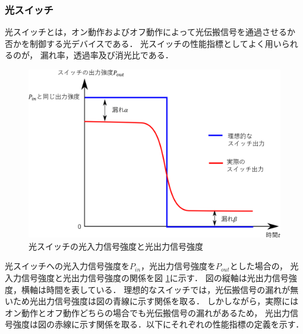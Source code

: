 \subsubsection{光スイッチ}
光スイッチとは，オン動作およびオフ動作によって光伝搬信号を通過させるか
否かを制御する光デバイスである．
光スイッチの性能指標としてよく用いられるのが，
漏れ率，透過率及び消光比である．
\begin{figure}[t!]
\begin{center}
\includegraphics[keepaspectratio,scale=0.5]{fig/3/swichout.eps}
\caption{光スイッチの光入力信号強度と光出力信号強度}
\label{fig:swichout}
\end{center}
\end{figure}
光スイッチへの光入力信号強度を$P_{in}$，光出力信号強度を$P_{out}$とした場合の，
光入力信号強度と光出力信号強度の関係を図 \ref{fig:swichout}に示す．
図の縦軸は光出力信号強度，横軸は時間を表している．
理想的なスイッチでは，光伝搬信号の漏れが無いため光出力信号強度は図の青線に示す関係を取る．
しかしながら，実際にはオン動作とオフ動作どちらの場合でも光伝搬信号の漏れがあるため，
光出力信号強度は図の赤線に示す関係を取る．以下にそれぞれの性能指標の定義を示す．
